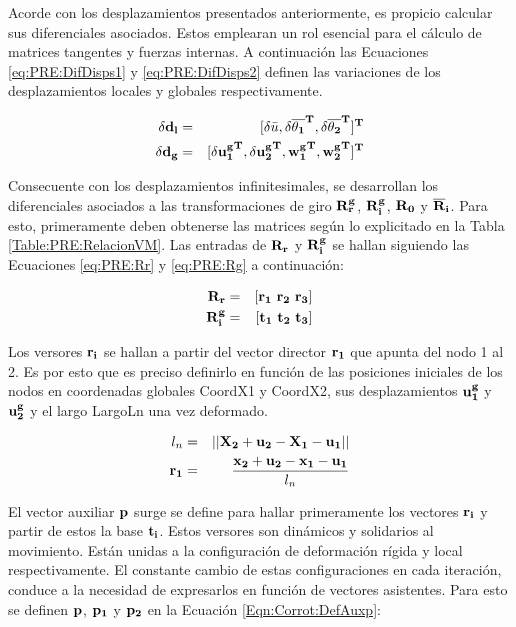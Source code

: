 Acorde con los desplazamientos presentados anteriormente, es propicio calcular sus diferenciales asociados. Estos emplearan un rol esencial para el cálculo de matrices tangentes y fuerzas internas. A continuación las Ecuaciones \eqref{eq:PRE:DifDisps1} y \eqref{eq:PRE:DifDisps2}
definen las variaciones de los desplazamientos locales y globales respectivamente.

\begin{eqnarray}\label{eq:PRE:DifDisps1}
		\bf{\delta d_l} &=& [\delta\bar{u}, \bf{\delta\overline{ \theta _1}^T},	\bf{\delta \overline{ \theta _2}^T}]^T\\
	\label{eq:PRE:DifDisps2}
	\bf{\delta d_g} &=& [\bf{\delta u_1^g}^T, \bf{\delta u_2^g}^T, \bf{{w_1^g}^T}, \bf{{w_2^g}^T}]^T
\end{eqnarray}

Consecuente con los desplazamientos infinitesimales, se desarrollan los diferenciales asociados a las transformaciones de giro $\bf{R_r^g}$, $\bf{R_i^g}$, $\bf{R_0}$ y $\bf{\overline{R}}_i$.
Para esto, primeramente deben obtenerse las matrices según lo explicitado en la Tabla \ref{Table:PRE:RelacionVM}. Las entradas de $\bf{R}_r$ y  $\bf{R}_i^g$ se hallan siguiendo las Ecuaciones \eqref{eq:PRE:Rr} y \eqref{eq:PRE:Rg} a continuación:

\begin{eqnarray}
	\label{eq:PRE:Rr}
	\bf{R_r}&=&[\bf{r_1} ~ \bf{r_2} ~ \bf{r_3}]\\
	\label{eq:PRE:Rg}
	\bf{R}_i^g&=&[\bf{t_1} ~ \bf{t_2} ~ \bf{t_3}]
\end{eqnarray}

 Los versores $\bf{r_i}$  se hallan a partir del vector director $\bf{r_1}$ que apunta del nodo 1 al 2. Es por esto que es preciso definirlo en función de las posiciones iniciales de los nodos en coordenadas globales \gls{CoordX1} y \gls{CoordX2}, sus desplazamientos $\bf{u}_1^g$ y $\bf{u}_2^g$ y el largo \gls{LargoLn} una vez deformado.

\begin{eqnarray}
	l_n&=& ||\bf{X}_2+\bf{u}_2-\bf{X}_1-\bf{u}_1||\\
	\bf{r_1}&=&\frac{\bf{x}_2+\bf{u}_2-\bf{x}_1-\bf{u}_1}{l_n}
\end{eqnarray}

El vector auxiliar $\bf{p}$ surge se define para hallar primeramente los vectores $\bf{r}_i$ y partir de estos la base $\bf{t}_i$. Estos versores son dinámicos y solidarios al movimiento. Están unidas a la configuración de deformación rígida y local respectivamente. El constante cambio de estas configuraciones en cada iteración, conduce a la necesidad de expresarlos en función de vectores asistentes.  Para esto se definen
$\bf{p}$, $\bf{p_1}$ y $\bf{p_2}$ en la Ecuación \eqref{Eqn:Corrot:DefAuxp}:

